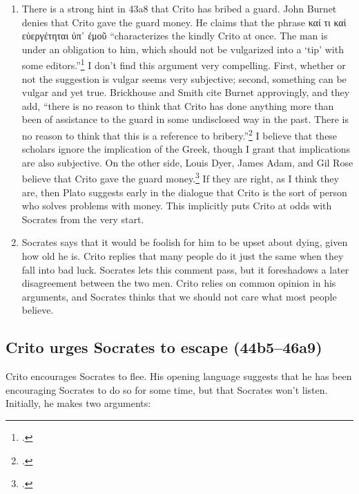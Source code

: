 \documentclass[12pt,letterpaper]{article}
\begin{document}
\begin{enumerate}

    \item There is a strong hint in 43a8 that Crito has bribed a guard. John Burnet denies that Crito gave the guard money. He claims that the phrase \textgreek{καί τι καὶ εὐεργέτηται ὑπ᾽ ἐμοῦ} ``characterizes the kindly Crito at once. The man is under an obligation to him, which should not be vulgarized into a `tip' with some editors.''\footcite[][on 43a8]{burnet1924-euthyphro-apology-crito} I don't find this argument very compelling. First, whether or not the suggestion is vulgar seems very subjective; second, something can be vulgar and yet true. Brickhouse and Smith cite Burnet approvingly, and they add, ``there is no reason to think that Crito has done anything more than been of assistance to the guard in some undisclosed way in the past. There is no reason to think that this is a reference to bribery.''\footcite[][249]{brickhouse-smith2004-plato-trial-of-socrates}  I believe that these scholars ignore the implication of the Greek, though I grant that implications are also subjective. On the other side, Louis Dyer, James Adam, and Gil Rose believe that Crito gave the guard money.\footcites[][on 43a9]{dyer-apology-crito-2007}[][on 43a9]{adam1988-crito}[][on 43a8]{rose1983} If they are right, as I think they are, then Plato suggests early in the dialogue that Crito is the sort of person who solves problems with money. This implicitly puts Crito at odds with Socrates from the very start.

    \item Socrates says that it would be foolish for him to be upset about dying, given how old he is. Crito replies that many people do it just the same when they fall into bad luck. Socrates lets this comment pass, but it foreshadows a later disagreement between the two men. Crito relies on common opinion in his arguments, and Socrates thinks that we should not care what most people believe.
\end{enumerate}


\subsection*{Crito urges Socrates to escape (44b5--46a9)}

Crito encourages Socrates to flee. His opening language suggests that he has been encouraging Socrates to do so for some time, but that Socrates won't listen. Initially, he makes two arguments:
\end{document}
